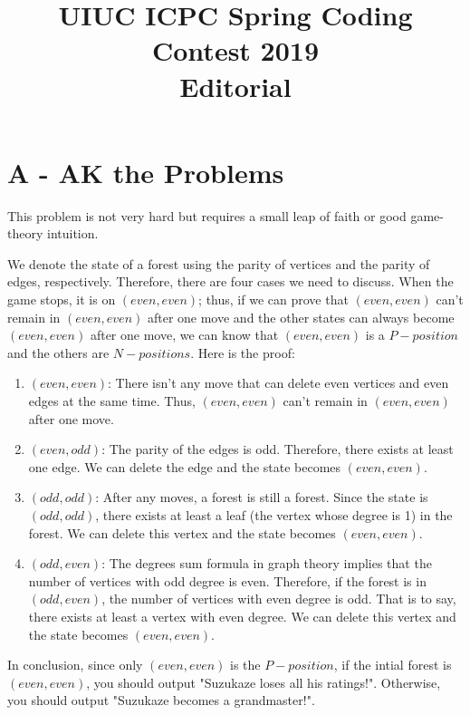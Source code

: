 \documentclass{article}
\title{UIUC ICPC Spring Coding Contest 2019 \\ Editorial}
\date{}
\begin{document}
\maketitle

\section*{A - AK the Problems}

This problem is not very hard but requires a small leap of faith or good game-theory intuition.

We denote the state of a forest using the parity of vertices and the parity of edges, respectively. Therefore, there are four cases we need to discuss. When the game stops, it is on $(even,even)$; thus, if we can prove that $(even,even)$ can't remain in $(even,even)$ after one move and the other states can always become $(even,even)$ after one move, we can know that $(even,even)$ is a $P-position$ and the others are $N-positions$. Here is the proof:

\begin{enumerate}
  \item $(even,even)$: \newline
  There isn't any move that can delete even vertices and even edges at the same time. Thus, $(even,even)$ can't remain in $(even,even)$ after one move.
  \item $(even,odd)$: \newline
  The parity of the edges is odd. Therefore, there exists at least one edge. We can delete the edge and the state becomes $(even,even)$.
  \item $(odd,odd)$: \newline
  After any moves, a forest is still a forest. Since the state is $(odd,odd)$, there exists at least a leaf (the vertex whose degree is 1) in the forest. We can delete this vertex and the state becomes $(even,even)$.
  \item $(odd,even)$: \newline
  The degrees sum formula in graph theory implies that the number of vertices with odd degree is even. Therefore, if the forest is in $(odd,even)$, the number of vertices with even degree is odd. That is to say, there exists at least a vertex with even degree. We can delete this vertex and the state becomes $(even,even)$.
\end{enumerate}
In conclusion, since only $(even,even)$ is the $P-position$, if the intial forest is $(even,even)$, you should output "Suzukaze loses all his ratings!". Otherwise, you should output "Suzukaze becomes a grandmaster!".
\end{document}
